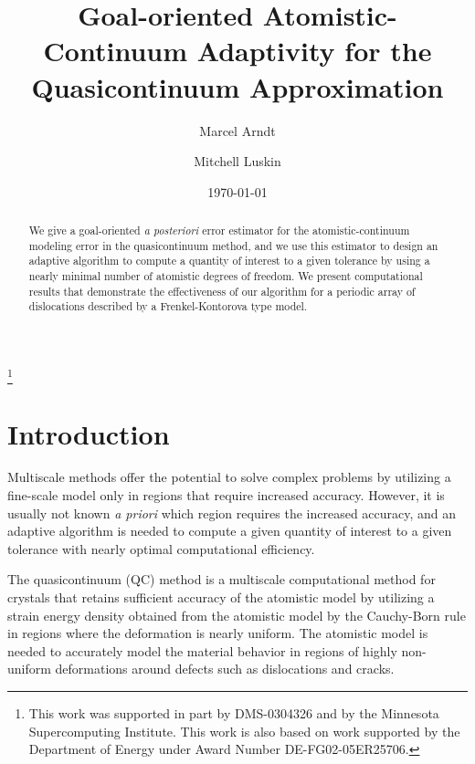 \documentclass[11pt,reqno,oneside]{amsart}
\numberwithin{equation}{section}
\begin{document}
\title[Goal-Oriented Atomistic-Continuum Adaptivity for the Quasicontinuum Approximation]
{Goal-oriented Atomistic-Continuum Adaptivity for the Quasicontinuum Approximation}
\author{Marcel Arndt}
\author{Mitchell Luskin}
\begin{abstract}
  We give a goal-oriented {\em a posteriori} error estimator for the atomistic-continuum modeling
  error in the quasicontinuum method, and we use this estimator to design an adaptive algorithm to
  compute a quantity of interest to a given tolerance by using a nearly minimal number of atomistic
  degrees of freedom.  We present computational results that demonstrate the effectiveness of our
  algorithm for a periodic array of dislocations described by a Frenkel-Kontorova type model.
\end{abstract}



\thanks{This work was supported in part by DMS-0304326 and by the Minnesota
  Supercomputing Institute. This work is also based on work supported by the
  Department of Energy under Award Number DE-FG02-05ER25706.}

\date{\today}

\maketitle

\section{Introduction}  \label{SecIntro}

Multiscale methods offer the potential to
solve complex problems by utilizing a fine-scale model
 only in regions that require increased accuracy.  However,
 it is usually not known {\it a priori} which region requires
 the increased accuracy, and an adaptive algorithm is needed
 to compute a given quantity of interest to a given tolerance
 with nearly optimal computational efficiency.

The quasicontinuum (QC) method
\cite{TadmorMillerPhillipsOrtiz:1999, TadmorOrtizPhillips:1996,
TadmorPhilipsOrtiz:1996,DobsonLuskin:2006} is a multiscale computational method
for crystals that retains sufficient
accuracy of the atomistic model by utilizing a strain energy
density obtained from the atomistic model by the Cauchy-Born rule
in regions where the deformation is nearly uniform.
The atomistic model is needed to accurately model the
material behavior in regions of highly non-uniform deformations
around defects such as dislocations and cracks.
\end{document}
